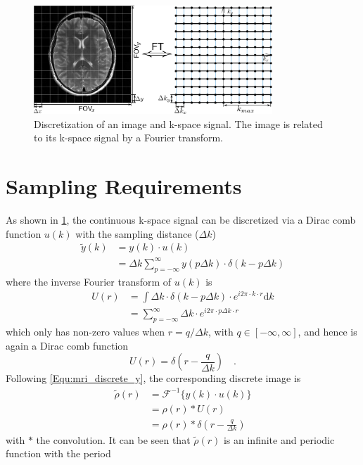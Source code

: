 \begin{figure}[tb]
  \centering
  \includegraphics[width=0.8\textwidth]{fig/mri-smp-req.png}
  \caption{Discretization of an image and k-space signal. The image is related to its k-space signal by a Fourier transform.} \label{Fig:mri-smp-req}
\end{figure}
\section{Sampling Requirements}
As shown in \cref{Fig:mri-smp-req}, the continuous k-space signal can be discretized via a Dirac comb function $u(k)$ with the sampling distance ($\Delta k$) 
\begin{align}
  \tilde{y}(k) 
  &= y(k) \cdot u(k) \label{Equ:mri_discrete_y}\\
  &= \Delta k \sum_{p=-\infty}^{\infty} y(p \Delta k) \cdot \delta(k - p \Delta k)
\end{align}
where the inverse Fourier transform of $u(k)$ is
\begin{align}
  U(r) 
  &= \int \Delta k \cdot \delta(k - p \Delta k) \cdot e^{i 2\pi \cdot k \cdot r} \text{d} k \\
  &= \sum_{p=-\infty}^{\infty} \Delta k \cdot e^{i 2\pi \cdot p \Delta k \cdot r}
\end{align}
which only has non-zero values when $r = q / \Delta k$, with $q \in [-\infty,\infty]$, and hence is again a Dirac comb function
\begin{equation}
  U(r) = \delta (r - \frac{q}{\Delta k}) \quad .
\end{equation}
Following \cref{Equ:mri_discrete_y}, the corresponding discrete image is
\begin{align}
  \tilde{\rho}(r) 
  &= \mathcal{F}^{-1} \{ y(k) \cdot u(k) \} \\
  &= \rho(r) \ast U(r) \\
  &= \rho(r) \ast \delta (r - \frac{q}{\Delta k})
\end{align}
with $\ast$ the convolution. It can be seen that $\tilde{\rho}(r)$ is an infinite and periodic function with the period
